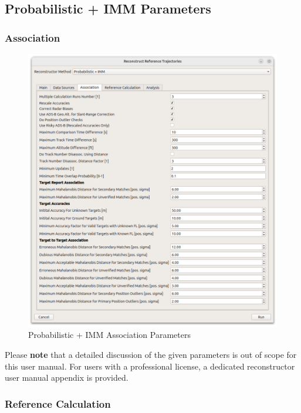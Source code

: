 \subsection{Probabilistic + IMM Parameters}

\subsubsection{Association}

\begin{figure}[H]
    \center
      \includegraphics[width=16cm]{figures/dialog_probimm_assoc.png}
    \caption{Probabilistic + IMM Association Parameters}
\end{figure}

Please \textbf{note} that a detailed discussion of the given parameters is out of scope for this user manual. For users with a professional license, a dedicated reconstructor user manual appendix is provided.

\subsubsection{Reference Calculation}

